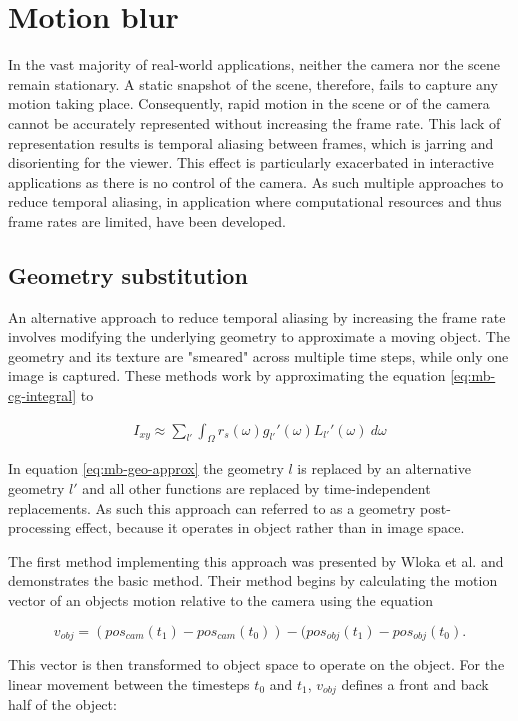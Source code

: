 \chapter{Motion blur}
\label{ch:mb}
In the vast majority of real-world applications, neither the camera nor the scene remain stationary.
A static snapshot of the scene, therefore, fails to capture any motion taking place.
Consequently, rapid motion in the scene or of the camera cannot be accurately represented without increasing the frame rate.
This lack of representation results is temporal aliasing between frames, which is jarring and disorienting for the viewer.
This effect is particularly exacerbated in interactive applications as there is no control of the camera.
As such multiple approaches to reduce temporal aliasing, in application where computational resources and thus frame rates are limited, have been developed.

\section{Geometry substitution}
\label{ch:mb-gs}
An alternative approach to reduce temporal aliasing by increasing the frame rate involves modifying the underlying geometry to approximate a moving object.
The geometry and its texture are "smeared" across multiple time steps, while only one image is captured.
These methods work by approximating the equation \ref{eq:mb-cg-integral} to 

\begin{align}
    I_{xy} \approx \sum_{l'} \int_\Omega r_s(\omega)g_{l'}'(\omega)L_{l'}'(\omega) \: d\omega
    \label{eq:mb-geo-approx}
\end{align}

In equation \ref{eq:mb-geo-approx} the geometry $l$ is replaced by an alternative geometry $l'$ and all other functions are replaced by time-independent replacements.
As such this approach can referred to as a geometry post-processing effect, because it operates in object rather than in image space.

The first method implementing this approach was presented by Wloka et al. \cite{Wloka.1996} and demonstrates the basic method.
Their method begins by calculating the motion vector of an objects motion relative to the camera using the equation

$$
v_{obj} = (pos_{cam}(t_1) - pos_{cam}(t_0)) - (pos_{obj}(t_1) - pos_{obj}(t_0).
$$

This vector is then transformed to object space to operate on the object.
For the linear movement between the timesteps $t_0$ and $t_1$, $v_{obj}$ defines a front and back half of the object:

